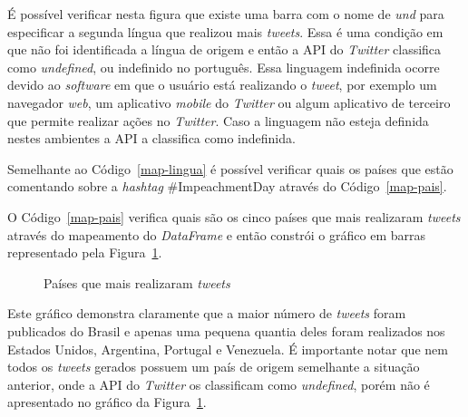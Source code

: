 É possível verificar nesta figura que existe uma barra com o nome de \textit{und} para especificar a segunda língua que realizou mais \textit{tweets}. Essa é uma condição em que não foi identificada a língua de origem e então a API do \textit{Twitter} classifica como \textit{undefined}, ou indefinido no português. Essa linguagem indefinida ocorre devido ao \textit{software} em que o usuário está realizando o \textit{tweet}, por exemplo um navegador \textit{web}, um aplicativo \textit{mobile} do \textit{Twitter} ou algum aplicativo de terceiro que permite realizar ações no \textit{Twitter}. Caso a linguagem não esteja definida nestes ambientes a API a classifica como indefinida.

Semelhante ao Código~\ref{map-lingua} é possível verificar quais os países que estão comentando sobre a \textit{hashtag} \#ImpeachmentDay através do Código~\ref{map-pais}.



O Código~\ref{map-pais} verifica quais são os cinco países que mais realizaram \textit{tweets} através do mapeamento do \textit{DataFrame} e então constrói o gráfico em barras representado pela Figura~\ref{paises}.

\begin{figure}[h]
	\centering
	\caption{Países que mais realizaram \textit{tweets}}
	\vspace{-0.3cm}
	\label{paises}
\end{figure}

Este gráfico demonstra claramente que a maior número de \textit{tweets} foram publicados do Brasil e apenas uma pequena quantia deles foram realizados nos Estados Unidos, Argentina, Portugal e Venezuela. É importante notar que nem todos os \textit{tweets} gerados possuem um país de origem semelhante a situação anterior, onde a API do \textit{Twitter} os classificam como \textit{undefined}, porém não é apresentado no gráfico da Figura~\ref{paises}.

